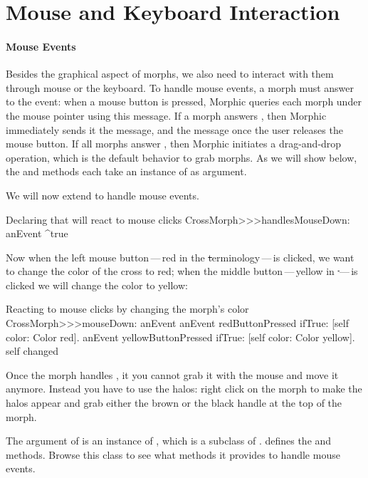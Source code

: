 \documentclass[a4paper,10pt,twoside]{book}
\begin{document}
\section{Mouse and Keyboard Interaction}

\paragraph{Mouse Events}
Besides the graphical aspect of morphs, we also need to interact with them through mouse or the keyboard.
To handle mouse events, a morph must answer  to the  event: when a mouse button is pressed, Morphic queries each morph under the mouse pointer using this message. If a morph answers , then Morphic immediately sends it the  message, and the  message once the user releases the mouse button.
If all morphs answer , then Morphic initiates a drag-and-drop operation, which is the default behavior to grab morphs.
As we will show below, the  and  methods each take an instance of  as argument.

We will now extend  to handle mouse events.

\begin{method}{Declaring that  will react to mouse clicks}
CrossMorph>>>handlesMouseDown: anEvent
   ^true
\end{method}

Now when the left mouse button\,---\,red in the \st terminology\,---\,is clicked, we want to change the color of the cross to red; when the middle button\,---\,yellow in \st\,---\,is clicked we will change the color to yellow:
\begin{method}{Reacting to mouse clicks by changing the morph's color}
CrossMorph>>>mouseDown: anEvent
   anEvent redButtonPressed
      ifTrue: [self color: Color red].
   anEvent yellowButtonPressed
      ifTrue: [self color: Color yellow].
   self changed
\end{method}

Once the morph handles , it you cannot grab it with the mouse and move it anymore. Instead you have to use the halos: right click on the morph to make the halos appear and grab either the brown or the black handle at the top of the morph.

The  argument of  is an instance of \mbox{,} which is a subclass of .  defines the  and  methods. Browse this class to see what methods it provides to handle mouse events.
\end{document}
